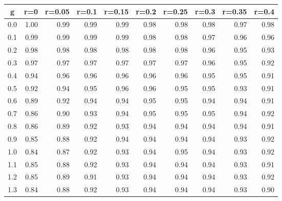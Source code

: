 %
\begin{table}[!tbp]
 \begin{center}
 \begin{tabular}{rrrrrrrrrr}\hline\hline
\multicolumn{1}{c}{g}&\multicolumn{1}{c}{r=0}&\multicolumn{1}{c}{r=0.05}&\multicolumn{1}{c}{r=0.1}&\multicolumn{1}{c}{r=0.15}&\multicolumn{1}{c}{r=0.2}&\multicolumn{1}{c}{r=0.25}&\multicolumn{1}{c}{r=0.3}&\multicolumn{1}{c}{r=0.35}&\multicolumn{1}{c}{r=0.4}\tabularnewline
\hline
0.0&1.00&0.99&0.99&0.99&0.98&0.98&0.98&0.97&0.98\tabularnewline
0.1&0.99&0.99&0.99&0.99&0.98&0.98&0.97&0.96&0.96\tabularnewline
0.2&0.98&0.98&0.98&0.98&0.98&0.98&0.96&0.95&0.93\tabularnewline
0.3&0.97&0.97&0.97&0.97&0.97&0.97&0.96&0.95&0.92\tabularnewline
0.4&0.94&0.96&0.96&0.96&0.96&0.96&0.95&0.95&0.91\tabularnewline
0.5&0.92&0.94&0.95&0.96&0.96&0.95&0.95&0.93&0.91\tabularnewline
0.6&0.89&0.92&0.94&0.94&0.95&0.95&0.94&0.94&0.91\tabularnewline
0.7&0.86&0.90&0.93&0.94&0.95&0.95&0.95&0.94&0.92\tabularnewline
0.8&0.86&0.89&0.92&0.93&0.94&0.94&0.94&0.94&0.91\tabularnewline
0.9&0.85&0.88&0.92&0.94&0.94&0.94&0.94&0.93&0.92\tabularnewline
1.0&0.84&0.87&0.92&0.93&0.94&0.95&0.94&0.93&0.92\tabularnewline
1.1&0.85&0.88&0.92&0.93&0.94&0.94&0.94&0.93&0.91\tabularnewline
1.2&0.85&0.89&0.91&0.93&0.94&0.94&0.94&0.93&0.92\tabularnewline
1.3&0.84&0.88&0.92&0.93&0.94&0.94&0.94&0.93&0.90\tabularnewline
\hline
\end{tabular}

\end{center}

\end{table}

